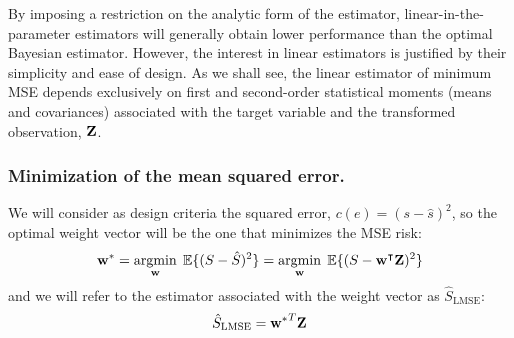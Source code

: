 
By imposing a restriction on the analytic form of the estimator, linear-in-the-parameter estimators will generally obtain lower performance than the optimal Bayesian estimator. However, the interest in linear estimators is justified by their simplicity and ease of design. As we shall see, the linear estimator of minimum MSE depends exclusively on first and second-order statistical moments (means and covariances) {associated with the target variable and the transformed observation, ${\bf Z}$}.



\subsubsection{Minimization of the {mean squared error}.}%

We will consider as design criteria the squared error, $c(e) = (s-\hat s)^2$, so the optimal weight vector will be the one that minimizes the MSE risk:
{\begin{equation}
{\bf w}^* 
	= \operatorname*{argmin}_{\bf w} \; \mathbb{E}\{(S - \hat S)^2\} 
    = \operatorname*{argmin}_{\bf w}\;  \mathbb{E}\{(S - {\bf w}^\intercal {\bf Z})^2\}
\end{equation}
and we will refer to the estimator associated with the weight vector as $\hat S_\text{LMSE}$: 
$$\hat S_\text{LMSE} = {{\bf w}^*}^T {\bf Z}$$}

